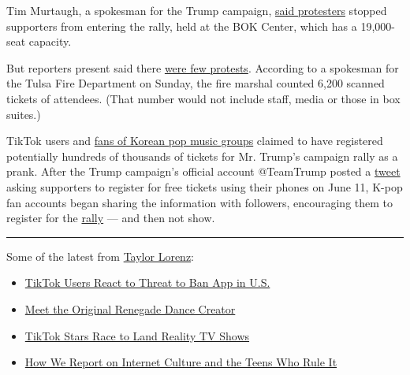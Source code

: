 Tim Murtaugh, a spokesman for the Trump campaign,
\href{https://twitter.com/cmsub/status/1274473814211125249/photo/1}{said
protesters} stopped supporters from entering the rally, held at the BOK
Center, which has a 19,000-seat capacity.

But reporters present said there
\href{https://www.nytimes3xbfgragh.onion/2020/06/20/us/trump-rally-tulsa.html\#link-60a18f83}{were
few protests}. According to a spokesman for the Tulsa Fire Department on
Sunday, the fire marshal counted 6,200 scanned tickets of attendees.
(That number would not include staff, media or those in box suites.)

TikTok users and
\href{https://www.nytimes3xbfgragh.onion/2018/12/11/smarter-living/the-edit-k-pop.html}{fans
of Korean pop music groups} claimed to have registered potentially
hundreds of thousands of tickets for Mr. Trump's campaign rally as a
prank. After the Trump campaign's official account @TeamTrump posted a
\href{https://twitter.com/TeamTrump/status/1271205174611259393}{tweet}
asking supporters to register for free tickets using their phones on
June 11, K-pop fan accounts began sharing the information with
followers, encouraging them to register for the
\href{https://www.nytimes3xbfgragh.onion/2020/07/08/us/politics/trump-rally-portsmouth-new-hampshire.html}{rally}
--- and then not show.

\begin{center}\rule{0.5\linewidth}{\linethickness}\end{center}

Some of the latest from
\href{https://www.nytimes3xbfgragh.onion/by/taylor-lorenz}{Taylor
Lorenz}:

\begin{itemize}
\item
  \href{https://www.nytimes3xbfgragh.onion/2020/07/10/style/tiktok-ban-us-users-influencers-taylor-lorenz.html}{TikTok
  Users React to Threat to Ban App in U.S.}
\item
  \href{https://www.nytimes3xbfgragh.onion/2020/02/13/style/the-original-renegade.html}{Meet
  the Original Renegade Dance Creator}
\item
  \href{https://www.nytimes3xbfgragh.onion/2020/07/09/style/tiktok-stars-race-to-land-reality-shows.html}{TikTok
  Stars Race to Land Reality TV Shows}
\item
  \href{https://www.nytimes3xbfgragh.onion/2020/07/16/style/taylor-lorenz-internet-culture-reporting.html}{How
  We Report on Internet Culture and the Teens Who Rule It}
\end{itemize}

